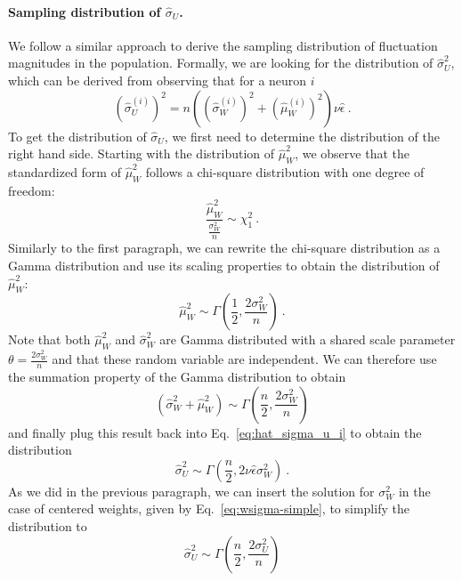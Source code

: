 \documentclass[11pt,a4paper]{article}
\begin{document}
\begin{refsection}
\paragraph{Sampling distribution of $\hat \sigma_U$.}
We follow a similar approach to derive the sampling distribution of fluctuation magnitudes in the population. Formally, we are looking for the distribution of $\hat \sigma_U^2$, which can be derived from observing that for a neuron $i$
\begin{equation} \label{eq:hat_sigma_u_i}
    \left(\hat \sigma_U^{(i)}\right)^2 = n \left(\left(\hat \sigma_W^{(i)}\right)^2 + \left(\hat \mu_W^{(i)} \right)^2 \right) \nu \hat \epsilon  ~.
\end{equation}
To get the distribution of $\hat \sigma_U$, we first need to determine the distribution of the right hand side. Starting with the distribution of $\hat\mu_W^2$, we observe that the standardized form of $\hat\mu_W^2$ follows a chi-square distribution with one degree of freedom:
\begin{equation}
    \frac{\hat \mu_W^2}{\frac{\sigma_W^2}{n}} \sim \chi^2_1 ~.
\end{equation}
Similarly to the first paragraph, we can rewrite the chi-square distribution as a Gamma distribution and use its scaling properties to obtain the distribution of $\hat \mu_W^2$:
\begin{equation}
    \hat \mu_W^2 \sim \Gamma\left(\frac{1}{2}, \frac{2 \sigma_W^2}{n} \right) ~ .
\end{equation}
Note that both $\hat \mu_W^2$ and $\hat \sigma_W^2$ are Gamma distributed with a shared scale parameter $\theta = \frac{2 \sigma_W^2}{n}$ and that these random variable are independent. We can therefore use the summation property of the Gamma distribution to obtain
\begin{equation}
    \left(\hat \sigma_W^2 + \hat \mu_W^2 \right) \sim \Gamma \left(\frac{n}{2}, \frac{2 \sigma_W^2}{n} \right)
\end{equation}
and finally plug this result back into Eq.~\eqref{eq:hat_sigma_u_i} to obtain the distribution
\begin{equation}
    \hat \sigma_U^2 \sim \Gamma \left(\frac{n}{2}, 2 \nu \hat\epsilon \sigma_W^2 \right) ~ .
\end{equation}
As we did in the previous paragraph, we can insert the solution for $\sigma_W^2$ in the case of centered weights, given by Eq.~\eqref{eq:wsigma-simple}, to simplify the distribution to
\begin{equation}
    \hat \sigma_U^2 \sim \Gamma \left(\frac{n}{2}, \frac{2 \sigma_U^2}{n} \right) 

\end{equation}
\end{refsection}
\end{document}
